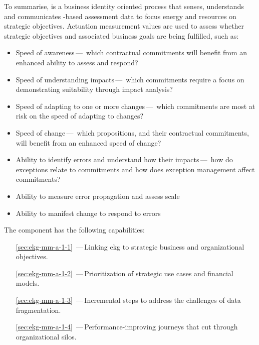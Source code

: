 To summarise, \textbf{} is a business identity oriented process
that senses, understands and communicates -based assessment data to focus energy and
resources on strategic objectives.
Actuation measurement values are used to assess whether strategic objectives and associated business goals are
being fulfilled, such as:
\begin{itemize}
    \item Speed of awareness\,---\,%
          which contractual commitments will benefit from an enhanced ability to assess and respond?
    \item Speed of understanding impacts\,---\,%
          which commitments require a focus on demonstrating suitability through impact analysis?
    \item Speed of adapting to one or more changes\,---\,%
          which commitments are most at risk on the speed of adapting to changes?
    \item Speed of change\,---\,%
          which propositions, and their contractual commitments, will benefit from an enhanced speed of change?
    \item Ability to identify errors and understand how their impacts\,---\,%
          how do exceptions relate to commitments and how does exception management affect commitments?
    \item Ability to measure error propagation and assess scale
    \item Ability to manifest change to respond to errors
\end{itemize}

The  component has the following capabilities:

\begin{itemize}[leftmargin=.5in]
  \item [\ref{sec:ekg-mm-a-1-1}] \,---\,Linking \gls{ekg} to strategic business and organizational objectives.
  \item [\ref{sec:ekg-mm-a-1-2}] \,---\,Prioritization of strategic use cases and financial models.
  \item [\ref{sec:ekg-mm-a-1-3}] \,---\,Incremental steps to address the challenges of data fragmentation.
  \item [\ref{sec:ekg-mm-a-1-4}] \,---\,Performance-improving journeys that cut through organizational silos.
\end{itemize}





